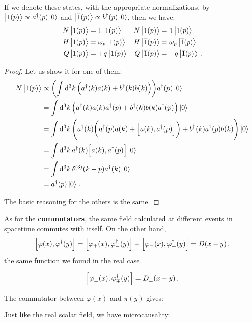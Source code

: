 \documentclass[main.tex]{subfiles}
\begin{document}
\begin{claim}
If we denote these states, with the appropriate normalizations, by \(\ket{1(p)} \propto a ^\dag (p) \ket{0}\) and \(\ket{\overline{1} (p)} \propto b ^\dag(p) \ket{0}\), then we have: 
%
\begin{align}
N \ket{1 (p)} &= 1 \ket{1 (p)} &
N \ket{\overline{1} (p)} &= 1 \ket{\overline{1} (p)}  \\
H \ket{1 (p)} &= \omega_{p} \ket{1 (p)} &
H \ket{\overline{1} (p)} &= \omega_{p} \ket{\overline{1} (p)}  \\
Q \ket{1 (p)} &= +q \ket{1 (p)} &
Q \ket{\overline{1} (p)} &= -q \ket{\overline{1} (p)}  
\,.
\end{align}
\end{claim}

\begin{proof}
Let us show it for one of them: 
%
\begin{align}
N \ket{1 (p)} &\propto
\qty(\int \dd[3]{k} \qty(a ^\dag(k) a(k) + b ^\dag(k) b (k))) 
a ^\dag (p) \ket{0}  \\
&= \int \dd[3]{k} \qty( a ^\dag (k) a (k) a ^\dag(p) + b ^\dag(k) b(k) a ^\dag (p)) \ket{0}  \\
&= \int \dd[3]{k} \qty( a ^\dag (k) \qty( a ^\dag(p) a (k) + \qty[a(k), a ^\dag(p)]) + b ^\dag(k) a ^\dag (p) b(k)) \ket{0}  \\
&= \int \dd[3]{k} a ^\dag (k) \qty[a(k), a ^\dag(p) ]  \ket{0}   \\
&= \int \dd[3]{k} \delta^{(3)} (k-p) a ^\dag(k) \ket{0} \\
&= a ^\dag(p) \ket{0}
\,.
\end{align}

The basic reasoning for the others is the same. 
\end{proof}

As for the \textbf{commutators}, the same field calculated at different events in spacetime commutes with itself. On the other hand, 
%
\begin{align}
\qty[ \varphi (x), \varphi ^\dag(y)]
= \qty[\varphi_{+} (x), \varphi ^\dag_{-} (y)]
+ \qty[\varphi_{-} (x), \varphi ^\dag_{+} (y)]
= D(x-y)
\,,
\end{align}
%
the same function we found in the real case. 

\begin{claim}
\begin{align}
\qty[\varphi_{\pm} (x), \varphi ^\dag_{\mp}(y)] = D_{\pm} (x-y)
\,.
\end{align}
\end{claim}

\begin{claim}
The commutator between \(\varphi (x)\) and \(\pi (y)\) gives: 
\end{claim}

Just like the real scalar field, we have microcausality. 
\end{document}
